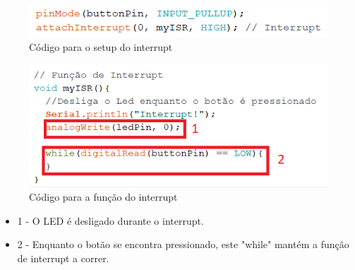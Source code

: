 \begin{figure}[H]
    \centering
    \includegraphics[scale=0.5]{images/codigo/sisA_interruptsetup.png}
    \caption{Código para o setup do interrupt}
\end{figure}

\begin{figure}[H]
    \centering
    \includegraphics[scale=0.5]{images/codigo/sisA_interruptfunction.png}
    \caption{Código para a função do interrupt}
\end{figure}

\begin{itemize}
    \item 1 - O LED é desligado durante o interrupt.
    \item 2 - Enquanto o botão se encontra pressionado, este "while" mantém a função de interrupt a correr.
\end{itemize}
